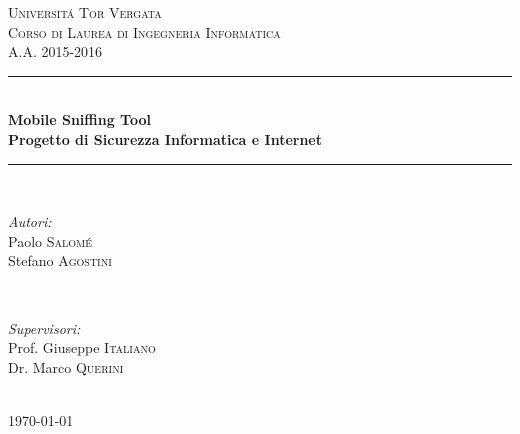 \documentclass[12pt]{article} %
\begin{document}

\begin{titlepage}

\newcommand{\HRule}{\rule{\linewidth}{0.5mm}} %

\center %

\textsc{\LARGE Universit\'a Tor Vergata}\\[1.5cm] %
\textsc{\Large Corso di Laurea di Ingegneria Informatica}\\[0.5cm] %
\textsc{\large A.A. 2015-2016}\\[0.5cm] %

\HRule \\[0.4cm]
{ \huge \bfseries Mobile Sniffing Tool}\\[0.4cm] %
{ \bfseries Progetto di Sicurezza Informatica e Internet}\\[0,4cm]
\HRule \\[1.5cm]

\begin{minipage}{0.4\textwidth}
\begin{flushleft} \large
\emph{Autori:}\\
Paolo \textsc{Salom\'e}\\
Stefano \textsc{Agostini} %
\end{flushleft}
\end{minipage}
~
\begin{minipage}{0.4\textwidth}
\begin{flushright} \large
\emph{Supervisori:}\\
Prof. Giuseppe \textsc{Italiano}\\ 
Dr. Marco \textsc{Querini}  %
\end{flushright}
\end{minipage}\\[8,5cm]

{\large \today}\\[3cm] %


\vfill %

\end{titlepage}
\end{document}
